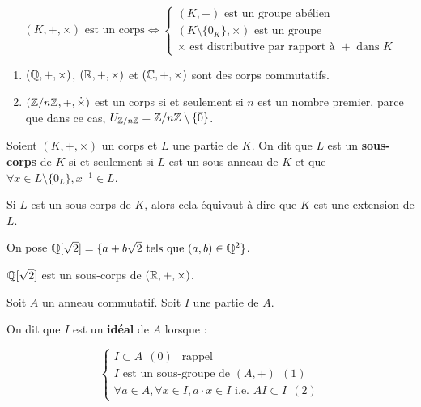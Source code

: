 \documentclass[12pt, a4paper]{report}
\begin{document}
\begin{remark}
    $$(K,+,\times) \text{ est un corps} \iff \begin{cases}(K,+) \text{ est un groupe abélien}\\(K\setminus\{0_K\},\times) \text{ est un groupe}\\ \times \text{ est distributive par rapport à } + \text{ dans } K\end{cases}$$
\end{remark}

\begin{example}
    \begin{enumerate}
        \item $(\mathbb{Q},+,\times)$, $(\mathbb{R},+,\times)$ et $(\mathbb{C},+,\times)$ sont des corps commutatifs.
        \item $(\mathbb{Z}/n\mathbb{Z},+,\dot\times)$ est un corps si et seulement si $n$ est un nombre premier, parce que dans ce cas, $U_{\mathbb{Z}/n\mathbb{Z}} = \mathbb{Z}/n\mathbb{Z}\setminus\{\overline{0}\}$.
    \end{enumerate}
\end{example}

\begin{definition}
    Soient $(K,+,\times)$ un corps et $L$ une partie de $K$. On dit que $L$ est un \textbf{sous-corps} de $K$ si et seulement si $L$ est un sous-anneau de $K$ et que $\forall x \in L\setminus\{0_L\}, x^{-1}\in L$.

    Si $L$ est un sous-corps de $K$, alors cela équivaut à dire que $K$ est une extension de $L$.
\end{definition}

\begin{example}
    On pose $\mathbb{Q}[\sqrt{2}] = \{a + b\sqrt{2} \text{ tels que } (a,b) \in \mathbb{Q}^2\}$.

    $\mathbb{Q}[\sqrt{2}]$ est un sous-corps de $(\mathbb{R},+,\times)$.
\end{example}

\begin{definition}
    Soit $A$ un anneau commutatif. Soit $I$ une partie de $A$.

    On dit que $I$ est un \textbf{idéal} de $A$ lorsque :

    $$\begin{cases}
    I \subset A~~(0)~~\text{ rappel }\\
    I \text{ est un sous-groupe de }(A,+)~~(1)\\
    \forall a \in A, \forall x \in I, a \cdot x \in I \text{ i.e. } AI \subset I~~(2)
    \end{cases}$$
    
\end{definition}
\end{document}

